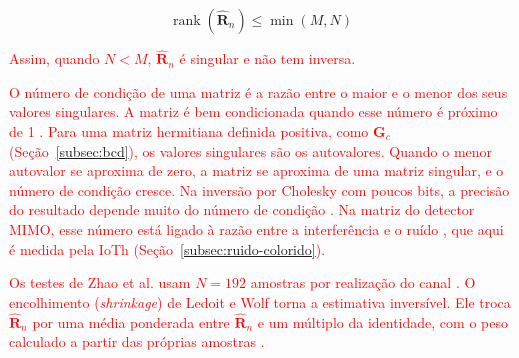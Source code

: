 \[
\operatorname{rank}(\widehat{\mathbf R}_n) \leq \min(M,N)
\]

\textcolor{red}{Assim, quando $N<M$, $\widehat{\mathbf R}_n$ é singular e não tem inversa.}

\textcolor{red}{O número de condição de uma matriz é a razão entre o maior e o menor dos seus valores singulares. A matriz é bem condicionada quando esse número é próximo de 1 \cite[p.~295]{tse-viswanath}. Para uma matriz hermitiana definida positiva, como $\mathbf G_c$ (Seção~\ref{subsec:bcd}), os valores singulares são os autovalores. Quando o menor autovalor se aproxima de zero, a matriz se aproxima de uma matriz singular, e o número de condição cresce. Na inversão por Cholesky com poucos bits, a precisão do resultado depende muito do número de condição \cite[p.~1603]{osinsky2023}. Na matriz do detector MIMO, esse número está ligado à razão entre a interferência e o ruído \cite[p.~1603]{osinsky2023}, que aqui é medida pela IoTh (Seção~\ref{subsec:ruido-colorido}).}

\textcolor{red}{Os testes de Zhao et al. usam $N=192$ amostras por realização do canal \cite{zhao2025jsac}. O encolhimento (\textit{shrinkage}) de Ledoit e Wolf torna a estimativa inversível. Ele troca $\hat{\mathbf R}_n$ por uma média ponderada entre $\hat{\mathbf R}_n$ e um múltiplo da identidade, com o peso calculado a partir das próprias amostras \cite{ledoit-wolf}.}





